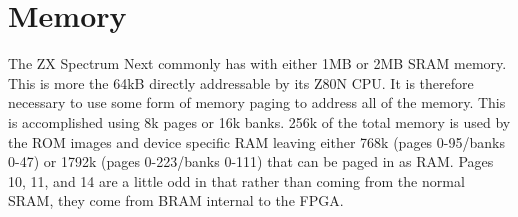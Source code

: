 \chapter{Memory}
The ZX Spectrum Next commonly has with either 1MB or 2MB SRAM
memory. This is more the 64kB directly addressable by its Z80N CPU. It
is therefore necessary to use some form of memory paging to address
all of the memory. This is accomplished using 8k pages or 16k
banks. 256k of the total memory is used by the ROM images and device
specific RAM leaving either 768k (pages 0-95/banks 0-47) or 1792k
(pages 0-223/banks 0-111) that can be paged in as RAM. Pages 10, 11,
and 14 are a little odd in that rather than coming from the normal
SRAM, they come from BRAM internal to the FPGA.




